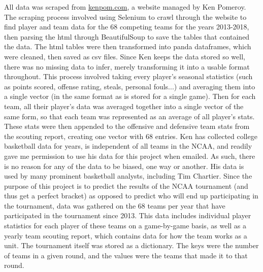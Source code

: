 All data was scraped from \href{https://kenpom.com}{kenpom.com}, a website managed by Ken Pomeroy.  
The scraping process involved using Selenium to crawl through the website to find player and team data for the 68 competing teams for the years 2013-2018, then parsing the html through BeautifulSoup to save the tables that contained the data.  
The html tables were then transformed into panda dataframes, which were cleaned, then saved as csv files.  
Since Ken keeps the data stored so well, there was no missing data to infer, merely transforming it into a usable format throughout.  
This process involved taking every player's seasonal statistics (such as points scored, offense rating, steals, personal fouls...) and averaging them into a single vector (in the same format as is stored for a single game).  Then for each team, all their player's data was averaged together into a single vector of the same form, so that each team was represented as an average of all player's stats.  
These stats were then appended to the offensive and defensive team stats from the scouting report, creating one vector with 68 entries.  
Ken has collected college basketball data for years, is independent of all teams in the NCAA, and readily gave me permission to use his data for this project when emailed.  
As such, there is no reason for any of the data to be biased, one way or another.  
His data is used by many prominent basketball analysts, including Tim Chartier.  
Since the purpose of this project is to predict the results of the NCAA tournament (and thus get a perfect bracket) as opposed to predict who will end up participating in the tournament, data was gathered on the 68 teams per year that have participated in the tournament since 2013.  
This data includes individual player statistics for each player of these teams on a game-by-game basis, as well as a yearly team scouting report, which contains data for how the team works as a unit.  
The tournament itself was stored as a dictionary.  
The keys were the number of teams in a given round, and the values were the teams that made it to that round.  